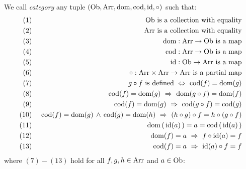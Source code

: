 \begin{defin}\label{Cat:def:category}
    We call {\em category} any tuple $(\mbox{\rm Ob}, \mbox{\rm Arr}, \mbox{\rm dom}, \mbox{\rm cod}, \mbox{\rm id}, \circ)$ 
    such that:
        \begin{eqnarray*}
            (1)&\ &\mbox{\rm Ob}\mbox{\ is a collection with equality}\\
            (2)&\ &\mbox{\rm Arr}\mbox{\ is a collection with equality}\\
            (3)&\ &\mbox{\rm dom}:\mbox{\rm Arr}\to\mbox{\rm Ob}\mbox{\ is a map}\\
            (4)&\ &\mbox{\rm cod}:\mbox{\rm Arr}\to\mbox{\rm Ob}\mbox{\ is a map}\\
            (5)&\ &\mbox{\rm id}:\mbox{\rm Ob}\to\mbox{\rm Arr}\mbox{\ is a map}\\
            (6)&\ &\circ:\mbox{\rm Arr}\times\mbox{\rm Arr}\to\mbox{\rm Arr}\mbox{\ is a partial map}\\
            (7)&\ &g\circ f\mbox{\ is defined}
                \ \Leftrightarrow\ \mbox{\rm cod}(f)=\mbox{\rm dom}(g) \\
            (8)&\ &\mbox{\rm cod}(f)=\mbox{\rm dom}(g)\ \Rightarrow\ \mbox{\rm dom}(g\circ f) = \mbox{\rm dom}(f)\\
            (9)&\ &\mbox{\rm cod}(f)=\mbox{\rm dom}(g)\ \Rightarrow\ \mbox{\rm cod}(g\circ f) = \mbox{\rm cod}(g)\\
            (10)&\ &\mbox{\rm cod}(f)=\mbox{\rm dom}(g)\,\land\,\mbox{\rm cod}(g)=\mbox{\rm dom}(h)
               \ \Rightarrow\ (h\circ g)\circ f = h\circ(g\circ f)\\
            (11)&\ &\mbox{\rm dom}\,(\,\mbox{\rm id}(a)\,) = a = \mbox{\rm cod}\,(\,\mbox{\rm id}(a)\,)\\
            (12)&\ &\mbox{\rm dom}(f)=a\ \Rightarrow\ f\circ\mbox{\rm id}(a) = f\\
            (13)&\ &\mbox{\rm cod}(f)=a\ \Rightarrow\ \mbox{\rm id}(a)\circ f = f
       \end{eqnarray*} 
    where $(7)-(13)$ hold for all $f,g,h\in\mbox{\rm Arr}$ and $a\in\mbox{\rm Ob}$: 
\end{defin}

